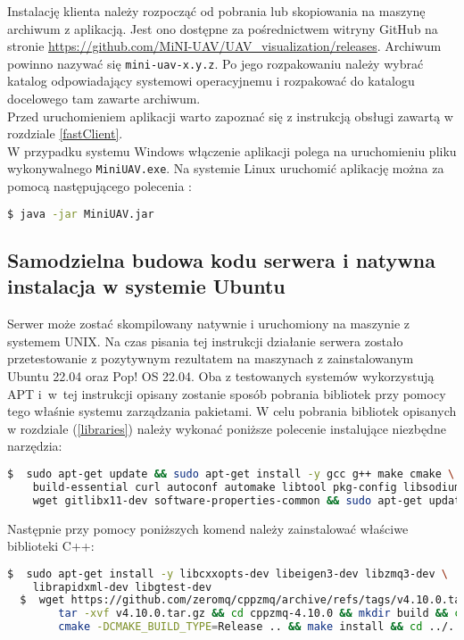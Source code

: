 Instalację klienta należy rozpocząć od pobrania lub skopiowania na maszynę archiwum z aplikacją. Jest ono dostępne za pośrednictwem witryny GitHub na stronie \url{https://github.com/MiNI-UAV/UAV\_visualization/releases}. Archiwum powinno nazywać się \texttt{mini-uav-x.y.z}. Po jego rozpakowaniu należy wybrać katalog odpowiadający systemowi operacyjnemu i rozpakować do katalogu docelowego tam zawarte archiwum. \\

Przed uruchomieniem aplikacji warto zapoznać się z instrukcją obsługi zawartą w rozdziale \ref{fastClient}. \\

W przypadku systemu Windows włączenie aplikacji polega na uruchomieniu pliku wykonywalnego \texttt{MiniUAV.exe}. Na systemie Linux uruchomić aplikację można za pomocą następującego polecenia :

\begin{lstlisting}[language=bash]
  $ java -jar MiniUAV.jar
\end{lstlisting}

\subsection{Samodzielna budowa kodu serwera i natywna instalacja w systemie Ubuntu}

Serwer może zostać skompilowany natywnie i uruchomiony na maszynie z systemem UNIX. Na czas pisania tej instrukcji działanie serwera zostało przetestowanie z pozytywnym rezultatem na maszynach z zainstalowanym Ubuntu 22.04 oraz Pop! OS 22.04. Oba z testowanych systemów wykorzystują APT i~w~tej instrukcji opisany zostanie sposób pobrania bibliotek przy pomocy tego właśnie systemu zarządzania pakietami. W celu pobrania bibliotek opisanych w rozdziale (\ref{libraries}) należy wykonać poniższe polecenie instalujące niezbędne narzędzia:
\begin{lstlisting}[language=bash]
  $  sudo apt-get update && sudo apt-get install -y gcc g++ make cmake \ 
	build-essential curl autoconf automake libtool pkg-config libsodium-dev \
 	wget gitlibx11-dev software-properties-common && sudo apt-get update 
\end{lstlisting}

Następnie przy pomocy poniższych komend należy zainstalować właściwe biblioteki C++:
\begin{lstlisting}[language=bash]
  $  sudo apt-get install -y libcxxopts-dev libeigen3-dev libzmq3-dev \
	librapidxml-dev libgtest-dev 
  $  wget https://github.com/zeromq/cppzmq/archive/refs/tags/v4.10.0.tar.gz && \
    	tar -xvf v4.10.0.tar.gz && cd cppzmq-4.10.0 && mkdir build && cd build && \
    	cmake -DCMAKE_BUILD_TYPE=Release .. && make install && cd ../..
\end{lstlisting}

